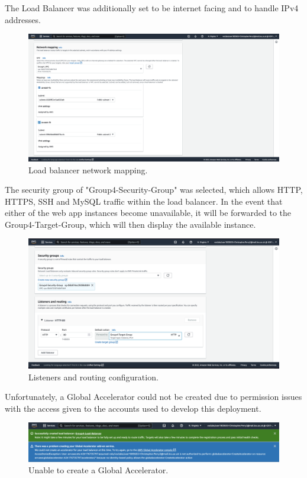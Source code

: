 The Load Balancer was additionally set to be internet facing and to handle IPv4 addresses.

\begin{figure}[!htbp]
	\centering
	\includegraphics[width=120mm]{resources/elb/elb-network-mapping}
	\caption{Load balancer network mapping.}
	\label{fig:elb-network-mapping}
\end{figure}

\clearpage
The security group of "Group4-Security-Group" was selected, which allows HTTP, HTTPS, SSH and MySQL traffic within
the load balancer.
In the event that either of the web app instances become unavailable, it will be forwarded to the Group4-Target-Group,
which will then display the available instance.

\begin{figure}[!htbp]
	\centering
	\includegraphics[width=120mm]{resources/elb/elb-security-groups-and-listeners}
	\caption{Listeners and routing configuration.}
	\label{fig:elb-security-groups}
\end{figure}

Unfortunately, a Global Accelerator could not be created due to permission issues with the access given to the accounts
used to develop this deployment.

\begin{figure}[!htbp]
	\centering
	\includegraphics[width=120mm]{resources/elb/elb-accelerator}
	\caption{Unable to create a Global Accelerator.}
	\label{fig:elb-accelerators}
\end{figure}

